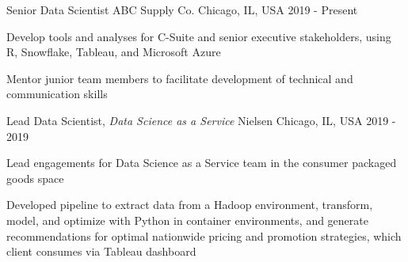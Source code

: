 
\begin{cventries}

 \cventry
    {Senior Data Scientist} %
    {ABC Supply Co.} %
    {Chicago, IL, USA} %
    {2019 - Present} %
    {
      \begin{cvitems}
        \item {Develop tools and analyses for C-Suite and senior executive stakeholders, using R, Snowflake, Tableau, and Microsoft Azure}
        \item {Mentor junior team members to facilitate development of technical and communication skills}
      \end{cvitems}
    }

 \cventry
    {Lead Data Scientist, \textit{Data Science as a Service}} %
    {Nielsen} %
    {Chicago, IL, USA} %
    {2019 - 2019} %
    {
      \begin{cvitems}
        \item {Lead engagements for Data Science as a Service team in the consumer packaged goods space}
        \item {Developed pipeline to extract data from a Hadoop environment, transform, model, and optimize with Python in container environments, and generate recommendations for optimal nationwide pricing and promotion strategies, which client consumes via Tableau dashboard}
      \end{cvitems}
    }


\end{cventries}
